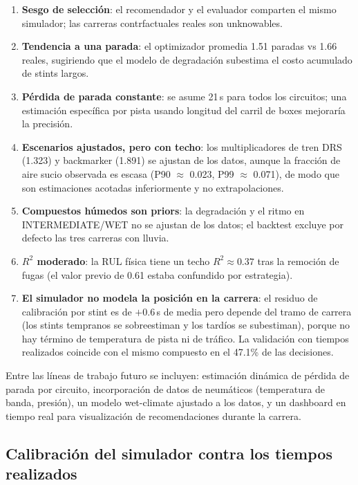 \documentclass[conference]{IEEEtran}
\begin{document}
\begin{enumerate}
  \item \textbf{Sesgo de selección}: el recomendador y el evaluador
        comparten el mismo simulador; las carreras contrfactuales reales
        son unknowables.
  \item \textbf{Tendencia a una parada}: el optimizador promedia 1.51
        paradas vs 1.66 reales, sugiriendo que el modelo de degradación
        subestima el costo acumulado de stints largos.
  \item \textbf{Pérdida de parada constante}: se asume 21\,s para todos
        los circuitos; una estimación específica por pista usando longitud
        del carril de boxes mejoraría la precisión.
  \item \textbf{Escenarios ajustados, pero con techo}: los multiplicadores
        de tren DRS (1.323) y backmarker (1.891) se ajustan de los datos,
        aunque la fracción de aire sucio observada es escasa
        (P90 $\approx$ 0.023, P99 $\approx$ 0.071), de modo que son
        estimaciones acotadas inferiormente y no extrapolaciones.
  \item \textbf{Compuestos húmedos son priors}: la degradación y el ritmo
        en INTERMEDIATE/WET no se ajustan de los datos; el backtest excluye
        por defecto las tres carreras con lluvia.
  \item \textbf{$R^2$ moderado}: la RUL física tiene un techo
        $R^2 \approx 0.37$ tras la remoción de fugas (el valor previo
        de 0.61 estaba confundido por estrategia).
  \item \textbf{El simulador no modela la posición en la carrera}: el
        residuo de calibración por stint es de $+0.6$\,s de media pero
        depende del tramo de carrera (los stints tempranos se sobreestiman
        y los tardíos se subestiman), porque no hay término de temperatura
        de pista ni de tráfico. La validación con tiempos realizados
        coincide con el mismo compuesto en el 47.1\% de las decisiones.
\end{enumerate}

Entre las líneas de trabajo futuro se incluyen: estimación dinámica de
pérdida de parada por circuito, incorporación de datos de neumáticos
(temperatura de banda, presión), un modelo wet-climate ajustado a los datos,
y un dashboard en tiempo real para visualización de recomendaciones durante
la carrera.

\subsection{Calibración del simulador contra los tiempos realizados}
\end{document}
